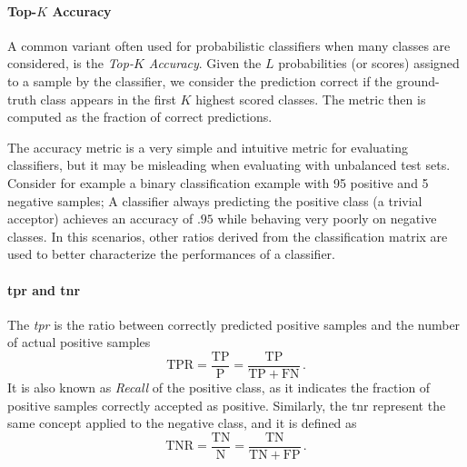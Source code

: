 \paragraph{Top-$K$ Accuracy}
A common variant often used for probabilistic classifiers when many classes are considered, is the \emph{Top-$K$ Accuracy}.
Given the $L$ probabilities (or scores) assigned to a sample by the classifier, we consider the prediction correct if the ground-truth class appears in the first $K$ highest scored classes.
The metric then is computed as the fraction of correct predictions.

The accuracy metric is a very simple and intuitive metric for evaluating classifiers, but it may be misleading when evaluating with unbalanced test sets.
Consider for example a binary classification example with 95 positive and 5 negative samples;
A classifier always predicting the positive class (a trivial acceptor) achieves an accuracy of $.95$ while behaving very poorly on negative classes.
In this scenarios, other ratios derived from the classification matrix are used to better characterize the performances of a classifier.

\paragraph{\acrshort{tpr} and \acrshort{tnr}}
The \emph{\gls{tpr}} is the ratio between correctly predicted positive samples and the number of actual positive samples
\begin{equation} \label{eq:back:tpr}
    \mathrm{TPR} = \frac{\mathrm{TP}}{\mathrm{P}} = \frac{\mathrm{TP}}{\mathrm{TP} + \mathrm{FN}} \,.
\end{equation}
It is also known as \emph{Recall} of the positive class, as it indicates the fraction of positive samples correctly accepted as positive.
Similarly, the \gls{tnr} represent the same concept applied to the negative class, and it is defined as
\begin{equation} \label{eq:back:tnr}
    \mathrm{TNR} = \frac{\mathrm{TN}}{\mathrm{N}} = \frac{\mathrm{TN}}{\mathrm{TN} + \mathrm{FP}} \,.
\end{equation}

